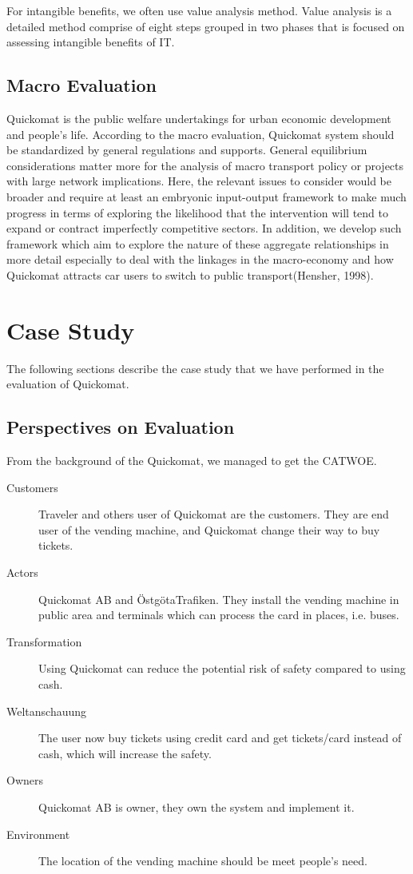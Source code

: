 \documentclass[twocolumn]{article}
\begin{document}
For intangible benefits, we often use value analysis method. Value analysis is a detailed method comprise of eight steps grouped in two phases that is focused on assessing intangible benefits of IT.

\subsection{Macro Evaluation}
Quickomat is the public welfare undertakings for urban economic development and people’s life. According to the macro evaluation, Quickomat system should be standardized by general regulations and supports. General equilibrium considerations matter more for the analysis of macro transport policy or projects with large network implications. Here, the relevant issues to consider would be broader and require at least an embryonic input-output framework to make much progress in terms of exploring the likelihood that the intervention will tend to expand or contract imperfectly competitive sectors. In addition, we develop such framework which aim to explore the nature of these aggregate relationships in more detail especially to deal with the linkages in the macro-economy and how Quickomat attracts car users to switch to public transport(Hensher, 1998).

\section{Case Study}
The following sections describe the case study that we have performed in the evaluation of  Quickomat.

\subsection{Perspectives on Evaluation}
From the background of the Quickomat, we managed to get the CATWOE.
\begin{description}
  \item[Customers]
    Traveler and others user of Quickomat are the customers. They are end user of the vending machine, and Quickomat change their way to buy tickets.
  \item[Actors]
    Quickomat AB and ÖstgötaTrafiken. They install the vending machine in public area and terminals which can process the card in places, i.e. buses.
  \item[Transformation]
    Using Quickomat can reduce the potential risk of safety compared to using cash.
  \item[Weltanschauung]
    The user now buy tickets using credit card and get tickets/card instead of cash, which will increase the safety.
  \item[Owners]
    Quickomat AB is owner, they own the system and implement it.
  \item[Environment]
    The location of the vending machine should be meet people’s need.
\end{description}
\end{document}

